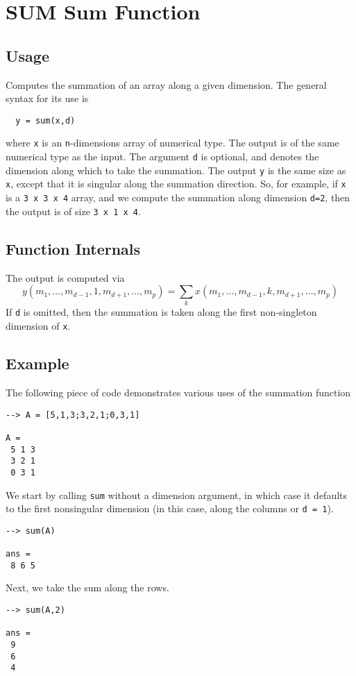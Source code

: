 \section{SUM Sum Function}

\subsection{Usage}

Computes the summation of an array along a given dimension.  The general
syntax for its use is
\begin{verbatim}
  y = sum(x,d)
\end{verbatim}
where \verb|x| is an \verb|n|-dimensions array of numerical type.
The output is of the same numerical type as the input.  The argument
\verb|d| is optional, and denotes the dimension along which to take
the summation.  The output \verb|y| is the same size as \verb|x|, except
that it is singular along the summation direction.  So, for example,
if \verb|x| is a \verb|3 x 3 x 4| array, and we compute the summation along
dimension \verb|d=2|, then the output is of size \verb|3 x 1 x 4|.
\subsection{Function Internals}

The output is computed via
\[
y(m_1,\ldots,m_{d-1},1,m_{d+1},\ldots,m_{p}) = 
\sum_{k} x(m_1,\ldots,m_{d-1},k,m_{d+1},\ldots,m_{p})
\]
If \verb|d| is omitted, then the summation is taken along the 
first non-singleton dimension of \verb|x|. 
\subsection{Example}

The following piece of code demonstrates various uses of the summation
function
\begin{verbatim}
--> A = [5,1,3;3,2,1;0,3,1]

A = 
 5 1 3 
 3 2 1 
 0 3 1 
\end{verbatim}
We start by calling \verb|sum| without a dimension argument, in which 
case it defaults to the first nonsingular dimension (in this case, 
along the columns or \verb|d = 1|).
\begin{verbatim}
--> sum(A)

ans = 
 8 6 5 
\end{verbatim}
Next, we take the sum along the rows.
\begin{verbatim}
--> sum(A,2)

ans = 
 9 
 6 
 4 
\end{verbatim}
